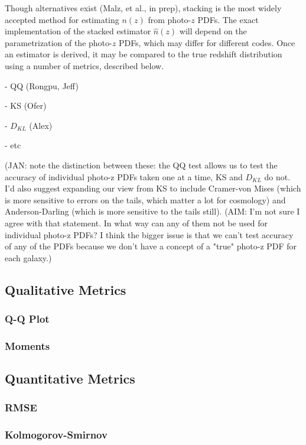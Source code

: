 \documentclass[usenatbib]{mn2e}
\begin{document}
Though alternatives exist (Malz, et al., in prep), stacking is the most widely accepted method for estimating $n(z)$ from photo-$z$ PDFs.  The exact implementation of the stacked estimator $\hat{n}(z)$ will depend on the parametrization of the photo-$z$ PDFs, which may differ for different codes.  Once an estimator is derived, it may be compared to the true redshift distribution using a number of metrics, described below.

- QQ (Rongpu, Jeff)

- KS (Ofer)

- $D_{KL}$ (Alex)

- etc

(JAN: note the distinction between these: the QQ test allows us to test the accuracy of individual  photo-z PDFs taken one at a time, KS and $D_{KL}$ do not.  I'd also suggest expanding our view from KS to include Cramer-von Mises (which is more sensitive to errors on the tails, which matter a lot for cosmology) and Anderson-Darling (which is more sensitive to the tails still).
(AIM: I'm not sure I agree with that statement.  In what way can any of them not be used for individual photo-z PDFs?  I think the bigger issue is that we  can't test accuracy of any of the PDFs because we don't have a concept of a "true" photo-z PDF for each galaxy.)

\subsection{Qualitative Metrics}
\label{sec:qualmet}

\subsubsection{Q-Q Plot}

\subsubsection{Moments}

\subsection{Quantitative Metrics}
\label{sec:quantmet}

\subsubsection{RMSE}

\subsubsection{Kolmogorov-Smirnov}
\end{document}
